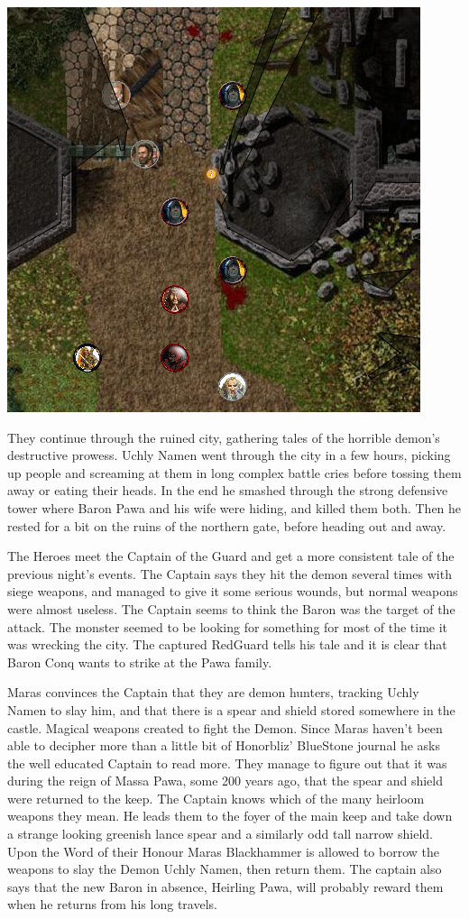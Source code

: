 \begin{center}
\vspace{0.5 cm}
\includegraphics[width=0.7\linewidth]{./figs/playthrough/castle-pawa.png}
\vspace{0.5 cm}
\end{center}

They continue through the ruined city, gathering tales of the horrible demon's destructive prowess. Uchly Namen went through the city in a few hours, picking up people and screaming at them in long complex battle cries before tossing them away or eating their heads.
In the end he smashed through the strong defensive tower where Baron Pawa and his wife were hiding, and killed them both. Then he rested for a bit on the ruins of the northern gate, before heading out and away.

The Heroes meet the Captain of the Guard and get a more consistent tale of the previous night's events. The Captain says they hit the demon several times with siege weapons, and managed to give it some serious wounds, but normal weapons were almost useless. The Captain seems to think the Baron was the target of the attack. The monster seemed to be looking for something for most of the time it was wrecking the city.
The captured RedGuard tells his tale and it is clear that Baron Conq wants to strike at the Pawa family.

Maras convinces the Captain that they are demon hunters, tracking Uchly Namen to slay him, and that there is a spear and shield stored somewhere in the castle. Magical weapons created to fight the Demon. Since Maras haven't been able to decipher more than a little bit of Honorbliz' BlueStone journal he asks the well educated Captain to read more.
They manage to figure out that it was during the reign of Massa Pawa, some 200 years ago, that the spear and shield were returned to the keep. The Captain knows which of the many heirloom weapons they mean.
He leads them to the foyer of the main keep and take down a strange looking greenish lance spear and a similarly odd tall narrow shield. Upon the Word of their Honour Maras Blackhammer is allowed to borrow the weapons to slay the Demon Uchly Namen, then return them. The captain also says that the new Baron in absence, Heirling Pawa, will probably reward them when he returns from his long travels.

